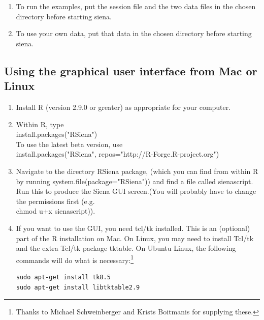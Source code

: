 \documentclass[a4paper,fleqn]{article}
\newcommand{\+}{\, + \,}
\newcommand{\sfn}[1]{\textsf{#1}}
\newcommand{\R}{{\sf R }}
\newcommand{\Rn}{{\sf R}}
\begin{document}
\begin{enumerate}
\begin{enumerate}
\item To run the examples, put the session file and the two data files in
the chosen directory before starting siena.

\item To use your own data, put that data in the chosen directory before
starting siena.
\end{enumerate}
\end{enumerate}

\subsection{Using the graphical user interface from Mac or Linux}
\begin{enumerate}
\item Install \R (version 2.9.0 or greater) as appropriate for your computer.
\item Within \Rn, type\\
  \sfn{install.packages("RSiena")}\\
To use the latest beta version, use\\
 \sfn{install.packages("RSiena", repos="http://R-Forge.R-project.org")}



\item Navigate to the directory RSiena package, (which you can find from within
  R by running \sfn{system.file(package="RSiena")}) and find a file called
  \sfn{sienascript}.  Run this to produce the Siena GUI screen.(You will
  probably have to change the permissions first (e.g.\ \\ \textsf{chmod u+x
    sienascript})).
\item If you want to use the GUI, you need tcl/tk installed. This is an
  (optional) part of the R installation on Mac. On Linux, you may need to
  install Tcl/tk and the extra Tcl/tk package \sfn{tktable}. On
  Ubuntu Linux, the following commands will do what is
  necessary:\protect\footnote{Thanks to Michael Schweinberger and Krists
    Boitmanis for supplying these.}
\begin{verbatim}
sudo apt-get install tk8.5
sudo apt-get install libtktable2.9
\end{verbatim}
\end{enumerate}
\end{document}
